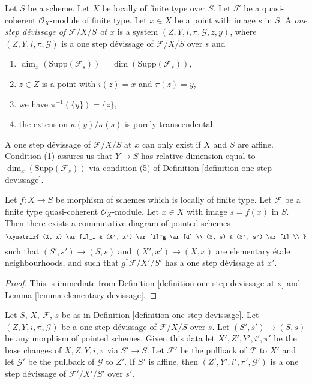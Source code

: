 \begin{definition}
\label{definition-one-step-devissage-at-x}
Let $S$ be a scheme.
Let $X$ be locally of finite type over $S$.
Let $\mathcal{F}$ be a quasi-coherent $\mathcal{O}_X$-module of finite type.
Let $x \in X$ be a point with image $s$ in $S$.
A {\it one step d\'evissage of $\mathcal{F}/X/S$ at $x$}
is a system $(Z, Y, i, \pi, \mathcal{G}, z, y)$, where
$(Z, Y, i, \pi, \mathcal{G})$ is a one step d\'evissage of
$\mathcal{F}/X/S$ over $s$ and
\begin{enumerate}
\item $\dim_x(\text{Supp}(\mathcal{F}_s)) = \dim(\text{Supp}(\mathcal{F}_s))$,
\item $z \in Z$ is a point with $i(z) = x$ and $\pi(z) = y$,
\item we have $\pi^{-1}(\{y\}) = \{z\}$,
\item the extension $\kappa(y)/\kappa(s)$ is purely
transcendental.
\end{enumerate}
\end{definition}

\noindent
A one step d\'evissage of $\mathcal{F}/X/S$ at $x$ can only exist if
$X$ and $S$ are affine. Condition (1) assures us that $Y \to S$ has
relative dimension equal to $\dim_x(\text{Supp}(\mathcal{F}_s))$
via condition (5) of
Definition \ref{definition-one-step-devissage}.

\begin{lemma}
\label{lemma-elementary-devissage-variant}
Let $f : X \to S$ be morphism of schemes which is locally of finite type.
Let $\mathcal{F}$ be a finite type quasi-coherent $\mathcal{O}_X$-module.
Let $x \in X$ with image $s = f(x)$ in $S$.
Then there exists a commutative diagram of pointed schemes
$$
\xymatrix{
(X, x) \ar[d]_f & (X', x') \ar[l]^g \ar[d] \\
(S, s) & (S', s') \ar[l] \\
}
$$
such that $(S', s') \to (S, s)$ and $(X', x') \to (X, x)$
are elementary \'etale neighbourhoods, and such that
$g^*\mathcal{F}/X'/S'$ has a one step d\'evissage at $x'$.
\end{lemma}

\begin{proof}
This is immediate from
Definition \ref{definition-one-step-devissage-at-x}
and
Lemma \ref{lemma-elementary-devissage}.
\end{proof}

\begin{lemma}
\label{lemma-base-change-one-step}
Let $S$, $X$, $\mathcal{F}$, $s$ be as in
Definition \ref{definition-one-step-devissage}.
Let $(Z, Y, i, \pi, \mathcal{G})$ be a one step d\'evissage
of $\mathcal{F}/X/S$ over $s$.
Let $(S', s') \to (S, s)$ be any morphism of pointed schemes.
Given this data let $X', Z', Y', i', \pi'$ be the base
changes of $X, Z, Y, i, \pi$ via $S' \to S$.
Let $\mathcal{F}'$ be the pullback of $\mathcal{F}$ to $X'$
and let $\mathcal{G}'$ be the pullback of $\mathcal{G}$ to $Z'$.
If $S'$ is affine, then $(Z', Y', i', \pi', \mathcal{G}')$
is a one step d\'evissage of $\mathcal{F}'/X'/S'$ over $s'$.
\end{lemma}

